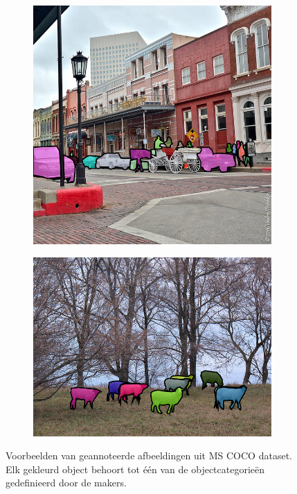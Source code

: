 \begin{figure}
    \centering
    \begin{subfigure}[b]{0.47\textwidth}
        \includegraphics[width=\textwidth]{Images/coco_example1.png}
    \end{subfigure}
    \begin{subfigure}[b]{0.47\textwidth}
        \includegraphics[width=\textwidth]{Images/coco_example2.png}
    \end{subfigure}
    \caption{Voorbeelden van geannoteerde afbeeldingen uit MS COCO dataset. Elk gekleurd object behoort tot \'e\'en van de objectcategorie\"en gedefinieerd door de makers.}
    \label{fig:cocoexamples}
\end{figure}



